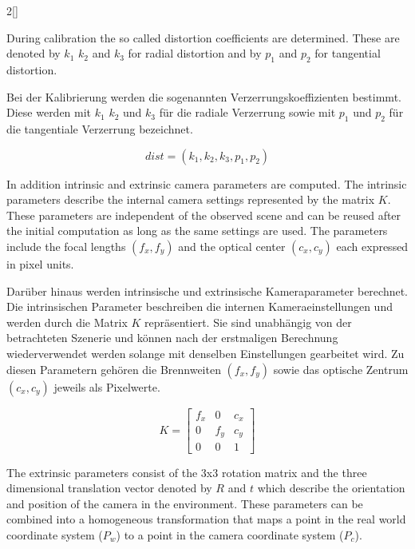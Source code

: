 \begin{paracol}{2}[]
\coleng

During calibration the so called distortion coefficients are determined. These are denoted by $k_1$ $k_2$ and $k_3$ for radial distortion and by $p_1$ and $p_2$ for tangential distortion.

\colger

Bei der Kalibrierung werden die sogenannten Verzerrungskoeffizienten bestimmt. Diese werden mit $k_1$ $k_2$ und $k_3$ für die radiale Verzerrung sowie mit $p_1$ und $p_2$ für die tangentiale Verzerrung bezeichnet.

\colende

$$ dist = (k_1, k_2, k_3, p_1, p_2) $$

\colstart

In addition intrinsic and extrinsic camera parameters are computed. The intrinsic parameters describe the internal camera settings represented by the matrix $K$. These parameters are independent of the observed scene and can be reused after the initial computation as long as the same settings are used. The parameters include the focal lengths $(f_x, f_y)$ and the optical center $(c_x, c_y)$ each expressed in pixel units.

\colger

Darüber hinaus werden intrinsische und extrinsische Kameraparameter berechnet. Die intrinsischen Parameter beschreiben die internen Kameraeinstellungen und werden durch die Matrix $K$ repräsentiert. Sie sind unabhängig von der betrachteten Szenerie und können nach der erstmaligen Berechnung wiederverwendet werden solange mit denselben Einstellungen gearbeitet wird. Zu diesen Parametern gehören die Brennweiten $(f_x, f_y)$ sowie das optische Zentrum $(c_x, c_y)$ jeweils als Pixelwerte.

\colende

$$ K = \begin{bmatrix}
	f_x & 0 & c_x \\
	0 & f_y & c_y \\
	0 & 0 & 1
\end{bmatrix}$$

\colstart

The extrinsic parameters consist of the 3x3 rotation matrix and the three dimensional translation vector denoted by $R$ and $t$ which describe the orientation and position of the camera in the environment. These parameters can be combined into a homogeneous transformation that maps a point in the real world coordinate system ($P_w$) to a point in the camera coordinate system ($P_c$).


\end{paracol}
